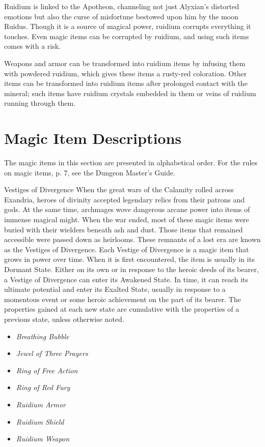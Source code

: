 \documentclass[a4paper, 11pt, bg=full, twocolumn, nooutline]{dndbook}
\begin{document}
Ruidium is linked to the Apotheon, channeling not just Alyxian's distorted emotions but also the curse of misfortune bestowed upon him by the moon Ruidus. Though it is a source of magical power, ruidium corrupts everything it touches. Even magic items can be corrupted by ruidium, and using such items comes with a risk.

Weapons and armor can be transformed into ruidium items by infusing them with powdered ruidium, which gives these items a rusty-red coloration. Other items can be transformed into ruidium items after prolonged contact with the mineral; such items have ruidium crystals embedded in them or veins of ruidium running through them.
\section{Magic Item Descriptions}

The magic items in this section are presented in alphabetical order. For the rules on magic items, p. 7, see the Dungeon Master's Guide.

\begin{DndSidebar}{Vestiges of Divergence}
When the great wars of the Calamity rolled across Exandria, heroes of divinity accepted legendary relics from their patrons and gods. At the same time, archmages wove dangerous arcane power into items of immense magical might. When the war ended, most of these magic items were buried with their wielders beneath ash and dust. Those items that remained accessible were passed down as heirlooms. These remnants of a lost era are known as the Vestiges of Divergence.
Each Vestige of Divergence is a magic item that grows in power over time. When it is first encountered, the item is usually in its Dormant State. Either on its own or in response to the heroic deeds of its bearer, a Vestige of Divergence can enter its Awakened State. In time, it can reach its ultimate potential and enter its Exalted State, usually in response to a momentous event or some heroic achievement on the part of its bearer. The properties gained at each new state are cumulative with the properties of a previous state, unless otherwise noted.
\end{DndSidebar}

\begin{itemize}
\item \textit{Breathing Bubble}
\item \textit{Jewel of Three Prayers}
\item \textit{Ring of Free Action}
\item \textit{Ring of Red Fury}
\item \textit{Ruidium Armor}
\item \textit{Ruidium Shield}
\item \textit{Ruidium Weapon}
\end{itemize}
\end{document}
